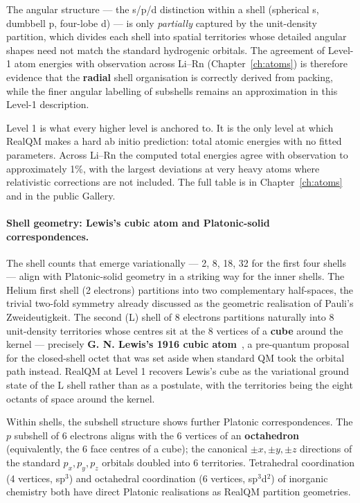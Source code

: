 The angular structure --- the s/p/d distinction within a shell (spherical s, dumbbell p, four-lobe d) --- is only \emph{partially} captured by the unit-density partition, which divides each shell into spatial territories whose detailed angular shapes need not match the standard hydrogenic orbitals. The agreement of Level-1 atom energies with observation across Li--Rn (Chapter~\ref{ch:atoms}) is therefore evidence that the \textbf{radial} shell organisation is correctly derived from packing, while the finer angular labelling of subshells remains an approximation in this Level-1 description.

Level 1 is what every higher level is anchored to. It is the only level at which RealQM makes a hard ab initio prediction: total atomic energies with no fitted parameters. Across Li--Rn the computed total energies agree with observation to approximately 1\%, with the largest deviations at very heavy atoms where relativistic corrections are not included. The full table is in Chapter~\ref{ch:atoms} and in the public Gallery.

\paragraph{Shell geometry: Lewis's cubic atom and Platonic-solid correspondences.}
The shell counts that emerge variationally --- 2, 8, 18, 32 for the first four shells --- align with Platonic-solid geometry in a striking way for the inner shells. The Helium first shell (2 electrons) partitions into two complementary half-spaces, the trivial two-fold symmetry already discussed as the geometric realisation of Pauli's Zweideutigkeit. The second (L) shell of 8 electrons partitions naturally into 8 unit-density territories whose centres sit at the 8 vertices of a \textbf{cube} around the kernel --- precisely \textbf{G. N. Lewis's 1916 cubic atom}~\cite{Lewis1916}, a pre-quantum proposal for the closed-shell octet that was set aside when standard QM took the orbital path instead. RealQM at Level 1 recovers Lewis's cube as the variational ground state of the L shell rather than as a postulate, with the territories being the eight octants of space around the kernel.

Within shells, the subshell structure shows further Platonic correspondences. The $p$ subshell of 6 electrons aligns with the 6 vertices of an \textbf{octahedron} (equivalently, the 6 face centres of a cube); the canonical $\pm x, \pm y, \pm z$ directions of the standard $p_x, p_y, p_z$ orbitals doubled into 6 territories. Tetrahedral coordination (4 vertices, sp$^3$) and octahedral coordination (6 vertices, sp$^3$d$^2$) of inorganic chemistry both have direct Platonic realisations as RealQM partition geometries.

